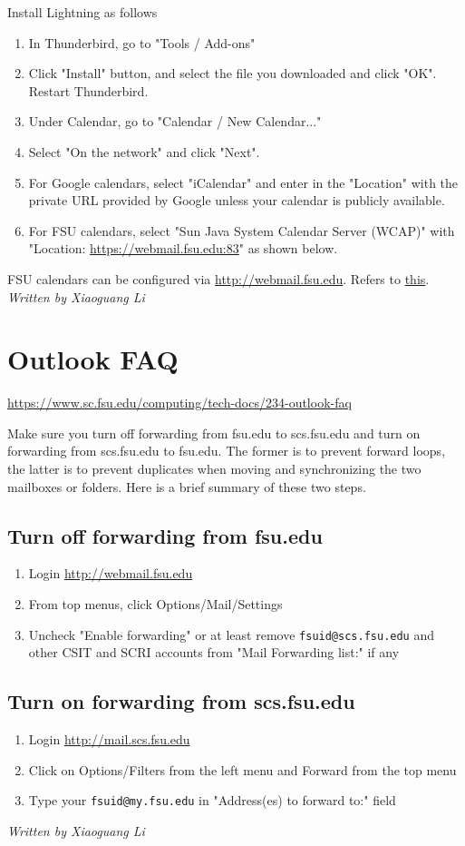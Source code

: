 \documentclass[12pt,a4paper]{article}
\begin{document}
Install Lightning as follows
\begin{enumerate}
    \item In Thunderbird, go to "Tools / Add-ons"
    \item Click "Install" button, and select the file you downloaded and click "OK". Restart Thunderbird.
    \item Under Calendar, go to "Calendar / New Calendar..."
    \item Select "On the network" and click "Next".
    \item For Google calendars, select "iCalendar" and enter in the "Location" with the private URL provided by Google unless your calendar is publicly available.
    \item For FSU calendars, select "Sun Java System Calendar Server (WCAP)" with "Location: \url{https://webmail.fsu.edu:83}" as shown below.
\end{enumerate}
FSU calendars can be configured via \url{http://webmail.fsu.edu}. Refers to \href{https://www.sc.fsu.edu/computing/tech-docs/243-fsu-calendar}{this}.
\hfill \textit{Written by Xiaoguang Li}

\section{Outlook FAQ}
\url{https://www.sc.fsu.edu/computing/tech-docs/234-outlook-faq}

Make sure you turn off forwarding from fsu.edu to scs.fsu.edu and turn on forwarding from scs.fsu.edu to fsu.edu. The former is to prevent forward loops, the latter is to prevent duplicates when moving and synchronizing the two mailboxes or folders. Here is a brief summary of these two steps.

\subsection*{Turn off forwarding from fsu.edu}
\begin{enumerate}
    \item Login \url{http://webmail.fsu.edu}
    \item From top menus, click Options/Mail/Settings
    \item Uncheck "Enable forwarding" or at least remove \texttt{fsuid@scs.fsu.edu} and other CSIT and SCRI accounts from "Mail Forwarding list:" if any
\end{enumerate}

\subsection*{Turn on forwarding from scs.fsu.edu}
\begin{enumerate}
    \item Login \url{http://mail.scs.fsu.edu}
    \item Click on Options/Filters from the left menu and Forward from the top menu
    \item Type your \texttt{fsuid@my.fsu.edu} in "Address(es) to forward to:" field
\end{enumerate}
\hfill \textit{Written by Xiaoguang Li}
\end{document}
